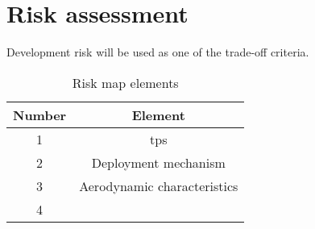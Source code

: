 \section{Risk assessment}
\label{ch:riskestimation}
Development risk will be used as one of the trade-off criteria. 

\begin{table}[h]
	\centering
	\caption{Risk map elements}
	\label{tab:riskmapelements}
	\begin{tabular}{|c|c|}
		\hline 
		\textbf{Number} & \textbf{Element} \\ \hline \hline
		1 & \acrlong{tps} \\
		2 & Deployment mechanism \\
		3 & Aerodynamic characteristics \\
		4 & \\
		\hline
	\end{tabular}
\end{table}

